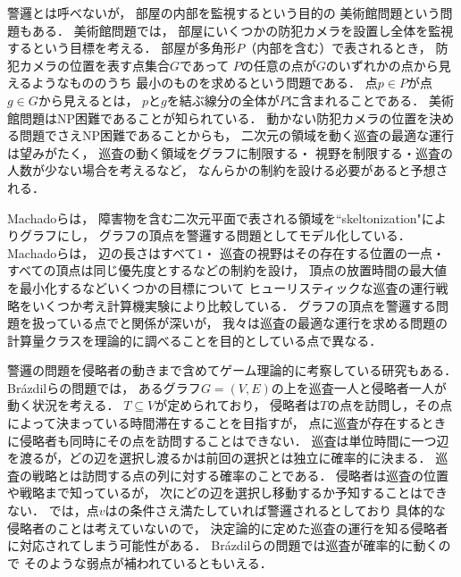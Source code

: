 警邏とは呼べないが，
部屋の内部を監視するという目的の
美術館問題\cite{lee1986computational}という問題もある．
美術館問題では，
部屋にいくつかの防犯カメラを設置し全体を監視するという目標を考える．
部屋が多角形$P$（内部を含む）で表されるとき，
防犯カメラの位置を表す点集合$G$であって
$P$の任意の点が$G$のいずれかの点から見えるようなもののうち
最小のものを求めるという問題である．
点$p \in P$が点$g \in G$から見えるとは，
$p$と$g$を結ぶ線分の全体が$P$に含まれることである．
美術館問題はNP困難であることが知られている\cite{lee1986computational}．
%
動かない防犯カメラの位置を決める問題でさえNP困難であることからも，
二次元の領域を動く巡査の最適な運行は望みがたく，
巡査の動く領域をグラフに制限する・
視野を制限する・巡査の人数が少ない場合を考えるなど，
なんらかの制約を設ける必要があると予想される．

Machadoら\cite{machado2002multi}は，
障害物を含む二次元平面で表される領域を``skeltonization"によりグラフにし，
グラフの頂点を警邏する問題としてモデル化している．
Machadoら\cite{machado2002multi}は，
辺の長さはすべて$1$・
巡査の視野はその存在する位置の一点・
すべての頂点は同じ優先度とするなどの制約を設け，
頂点の放置時間の最大値を最小化するなどいくつかの目標について
ヒューリスティックな巡査の運行戦略をいくつか考え計算機実験により比較している．
%
グラフの頂点を警邏する問題を扱っている点で{\PPProfit}と関係が深いが，
我々は巡査の最適な運行を求める問題の計算量クラスを理論的に調べることを目的としている点で異なる．


警邏の問題を侵略者の動きまで含めてゲーム理論的に考察している研究もある\cite{
    Alpern2016,
    alpern2011patrolling,
    brazdil2015strategy,
    fomin2008annotated,
    garrec2016continuous,
    papadaki2016patrolling}．
Br{\'a}zdilら\cite{brazdil2015strategy}の問題では，
あるグラフ$G = (V, E)$の上を巡査一人と侵略者一人が動く状況を考える．
$T \subseteq V$が定められており，
侵略者は$T$の点を訪問し，その点によって決まっている時間滞在することを目指すが，
点に巡査が存在するときに侵略者も同時にその点を訪問することはできない．
巡査は単位時間に一つ辺を渡るが，どの辺を選択し渡るかは前回の選択とは独立に確率的に決まる．
巡査の戦略とは訪問する点の列に対する確率のことである．
侵略者は巡査の位置や戦略まで知っているが，
次にどの辺を選択し移動するか予知することはできない．
%
{\PPProfit}では，点$v$は{\maxIdletime}の条件さえ満たしていれば警邏されるとしており
具体的な侵略者のことは考えていないので，
決定論的に定めた巡査の運行を知る侵略者に対応されてしまう可能性がある．
Br{\'a}zdilら\cite{brazdil2015strategy}の問題では巡査が確率的に動くので
そのような弱点が補われているともいえる．


